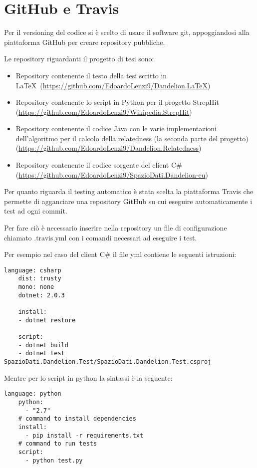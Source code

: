 \section{GitHub e Travis}
Per il versioning del codice si è scelto di usare il software git, appoggiandosi alla piattaforma GitHub per creare repository pubbliche. 

Le repository riguardanti il progetto di tesi sono:

\begin{itemize}
    \item Repository contenente il testo della tesi scritto in \LaTeX\ (\url{https://github.com/EdoardoLenzi9/Dandelion.LaTeX}) \\
    \item Repository contenente lo script in Python per il progetto StrepHit (\url{https://github.com/EdoardoLenzi9/Wikipedia.StrepHit}) \\
    \item Repository contenente il codice Java con le varie implementazioni dell'algoritmo per il calcolo della relatedness (la seconda parte del progetto) (\url{https://github.com/EdoardoLenzi9/Dandelion.Relatedness}) \\
    \item Repository contenente il codice sorgente del client C$\#$ (\url{https://github.com/EdoardoLenzi9/SpazioDati.Dandelion-eu})\\
\end{itemize} 

Per quanto riguarda il testing automatico è stata scelta la piattaforma Travis che permette di agganciare una repository GitHub su cui eseguire automaticamente i test 
ad ogni commit. 

Per fare ciò è necessario inserire nella repository un file di configurazione chiamato .travis.yml con i comandi necessari ad eseguire i test. 

Per esempio nel caso del client C$\#$ il file yml contiene le seguenti istruzioni:

\begin{lstlisting}[style=YmlStyle]
    language: csharp
    dist: trusty
    mono: none
    dotnet: 2.0.3

    install:
    - dotnet restore

    script:
    - dotnet build
    - dotnet test SpazioDati.Dandelion.Test/SpazioDati.Dandelion.Test.csproj
\end{lstlisting}

Mentre per lo script in python la sintassi è la seguente:
\begin{lstlisting}[style=YmlStyle]
    language: python
    python: 
      - "2.7"
    # command to install dependencies
    install:
      - pip install -r requirements.txt
    # command to run tests
    script:
      - python test.py
\end{lstlisting}


